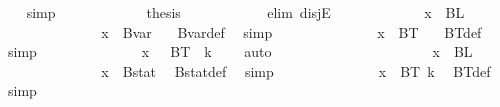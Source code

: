 \begin{isabellebody}
\ {\isacharasterisk}{\kern0pt}\ \isamarkupfalse%
\ simp\isanewline
\ \ \ \ \ \ \ \ \ \isamarkupfalse%
\ \isamarkupfalse%
\ {\isacharquery}{\kern0pt}thesis\ \isanewline
\ \ \ \ \ \ \ \ \ \isamarkupfalse%
\ {\isacharparenleft}{\kern0pt}elim\ disjE{\isacharparenright}{\kern0pt}\isanewline
\ \ \ \ \ \ \ \ \ \ \ \isamarkupfalse%
\ {\isachardoublequoteopen}x\ {\isasymin}\ BL\ {}{\isachardoublequoteclose}\isanewline
\ \ \ \ \ \ \ \ \ \ \ \isamarkupfalse%
\ \isamarkupfalse%
\ {\isachardoublequoteopen}x\ {\isasymin}\ Bvar\ {}{\isachardoublequoteclose}\ \isamarkupfalse%
\ Bvar{\isacharunderscore}{\kern0pt}def\ \isamarkupfalse%
\ simp\isanewline
\ \ \ \ \ \ \ \ \ \ \ \isamarkupfalse%
\ \isamarkupfalse%
\ {\isachardoublequoteopen}x\ {\isasymin}\ BT\ {}{\isachardoublequoteclose}\ \isamarkupfalse%
\ BT{\isacharunderscore}{\kern0pt}def\ \isamarkupfalse%
\ simp\isanewline
\ \ \ \ \ \ \ \ \ \ \ \isamarkupfalse%
\ \isamarkupfalse%
\ {\isachardoublequoteopen}x\ {\isasymin}\ {\isasymUnion}\ {\isacharparenleft}{\kern0pt}BT\ {\isacharbackquote}{\kern0pt}\ {\isacharbraceleft}{\kern0pt}{\isachardot}{\kern0pt}{\isachardot}{\kern0pt}k\ {\isacharplus}{\kern0pt}\ {}{\isacharbraceright}{\kern0pt}{\isacharparenright}{\kern0pt}{\isachardoublequoteclose}\ \isamarkupfalse%
\ auto\isanewline
\ \ \ \ \ \ \ \ \ \isamarkupfalse%
\isanewline
\ \ \ \ \ \ \ \ \ \ \ \isamarkupfalse%
\ {\isachardoublequoteopen}x\ {\isasymin}\ BL\ {}{\isachardoublequoteclose}\isanewline
\ \ \ \ \ \ \ \ \ \ \ \isamarkupfalse%
\ \isamarkupfalse%
\ {\isachardoublequoteopen}x\ {\isasymin}\ Bstat{\isachardoublequoteclose}\ \isamarkupfalse%
\ Bstat{\isacharunderscore}{\kern0pt}def\ \isamarkupfalse%
\ simp\isanewline
\ \ \ \ \ \ \ \ \ \ \ \isamarkupfalse%
\ \isamarkupfalse%
\ {\isachardoublequoteopen}x\ {\isasymin}\ BT\ {\isacharparenleft}{\kern0pt}k{\isacharplus}{\kern0pt}{}{\isacharparenright}{\kern0pt}{\isachardoublequoteclose}\ \isamarkupfalse%
\ BT{\isacharunderscore}{\kern0pt}def\ \isamarkupfalse%
\ simp\isanewline
\ \ \ \ \ \ \ \ \ \ \ \isamarkupfalse%
\ \isamarkupfalse%

\end{isabellebody}
